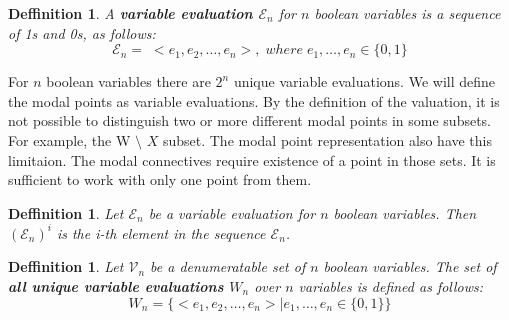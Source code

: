 \documentclass{article}
\newcommand\V{\mathcal{V}}
\newcommand\E{\mathcal{E}}
\newcommand\VX{X}
\newtheorem{defn}[theorem]{Deffinition}
\begin{document}
		
		
		\begin{defn}
			A \textbf{variable evaluation $\E_n$} for $n$ boolean variables is a sequence of 1s and 0s, as follows:
			\begin{equation}
				\E_n = \; < e_1, e_2, \ldots , e_n >, \; where \; e_1, \ldots, e_n \in \{0, 1 \}
			\end{equation}
		\end{defn}

		For $n$ boolean variables there are $2^n$ unique variable evaluations. We will define the modal points as variable evaluations. By the definition of the valuation, it is not possible to distinguish two or more different modal points in some subsets. For example, the W $\setminus$ $\VX$ subset. The modal point representation also have this limitaion. The modal connectives require existence of a point in those sets. It is sufficient to work with only one point from them.

		\begin{defn}
			Let $\E_n$ be a variable evaluation for $n$ boolean variables. Then $(\E_n)^i$ is the i-th element in the sequence $\E_n$.
		\end{defn}

		\begin{defn}
			Let $\V_n$ be a denumeratable set of $n$ boolean variables. The set of \textbf{all unique variable evaluations $W_n$} over $n$ variables is defined as follows:
			\begin{equation}
				\label{all-unique-points}
				W_n = \{< e_1, e_2, \ldots , e_n > \mid e_1, \ldots, e_n \in \{0, 1 \} \}
			\end{equation}
		\end{defn}
\end{document}
